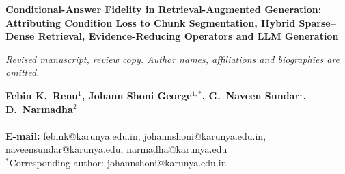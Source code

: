 \documentclass[12pt,twoside]{article}
\begin{document}
 \begin{singlespace}
 \begin{center}
\fontsize{24}{24}\selectfont\textbf
{Conditional-Answer Fidelity in Retrieval-Augmented Generation: Attributing Condition Loss to Chunk Segmentation, Hybrid Sparse--Dense Retrieval, Evidence-Reducing Operators and LLM Generation}
\end{center}
\vspace{24pt}
\ifdefined\reviewcopy
\begin{center}\fontsize{11}{11}\selectfont\textit{Revised manuscript, review copy. Author names, affiliations and biographies are omitted.}\end{center}
\else
{\raggedright
\fontsize{16}{20}\selectfont\textbf{%
Febin K.~Renu$^1$, Johann Shoni George$^{1,*}$, G.~Naveen Sundar$^1$, D.~Narmadha$^2$}
\vspace{16pt}\\
\fontsize{11}{13}\selectfont {
$^1$Division of Computer Science and Engineering,\\
$^2$Division of Artificial Intelligence and Machine Learning,\\
Karunya Institute of Technology and Sciences, Coimbatore, India
}\vspace{16pt}\\
{\fontsize{9}{11}\selectfont\textbf{{E-mail:}} febink@karunya.edu.in, johannshoni@karunya.edu.in, naveensundar@karunya.edu, narmadha@karunya.edu\\
$^*$Corresponding author: johannshoni@karunya.edu.in}\par}
\fi

\end{singlespace}
\fontsize{12}{12}\selectfont
\begin{onehalfspace}









\end{onehalfspace}
 
\end{document}
